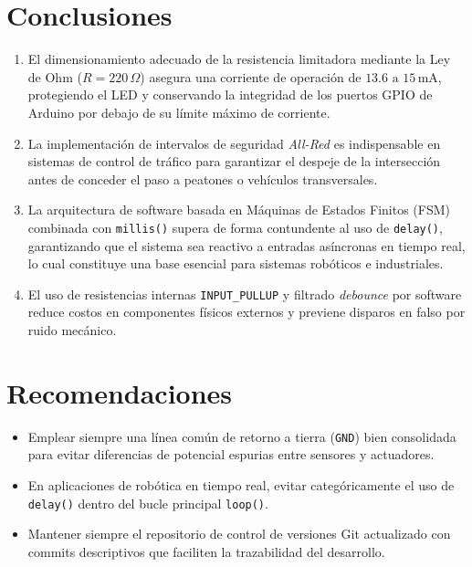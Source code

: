\documentclass[12pt,a4paper]{article}
\begin{document}
\section{Conclusiones}
\begin{enumerate}
    \item El dimensionamiento adecuado de la resistencia limitadora mediante la Ley de Ohm ($R = 220\,\Omega$) asegura una corriente de operación de $13.6\text{ a }15\,\text{mA}$, protegiendo el LED y conservando la integridad de los puertos GPIO de Arduino por debajo de su límite máximo de corriente.
    \item La implementación de intervalos de seguridad \textit{All-Red} es indispensable en sistemas de control de tráfico para garantizar el despeje de la intersección antes de conceder el paso a peatones o vehículos transversales.
    \item La arquitectura de software basada en Máquinas de Estados Finitos (FSM) combinada con \texttt{millis()} supera de forma contundente al uso de \texttt{delay()}, garantizando que el sistema sea reactivo a entradas asíncronas en tiempo real, lo cual constituye una base esencial para sistemas robóticos e industriales.
    \item El uso de resistencias internas \texttt{INPUT\_PULLUP} y filtrado \textit{debounce} por software reduce costos en componentes físicos externos y previene disparos en falso por ruido mecánico.
\end{enumerate}

\section{Recomendaciones}
\begin{itemize}[noitemsep]
    \item Emplear siempre una línea común de retorno a tierra (\texttt{GND}) bien consolidada para evitar diferencias de potencial espurias entre sensores y actuadores.
    \item En aplicaciones de robótica en tiempo real, evitar categóricamente el uso de \texttt{delay()} dentro del bucle principal \texttt{loop()}.
    \item Mantener siempre el repositorio de control de versiones Git actualizado con commits descriptivos que faciliten la trazabilidad del desarrollo.
\end{itemize}

\end{document}
